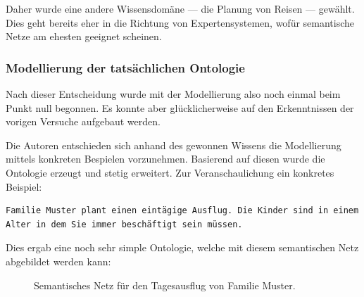 Daher wurde eine andere Wissensdomäne --- die Planung von Reisen --- gewählt. Dies geht bereits eher in die Richtung von Expertensystemen, wofür semantische Netze am ehesten geeignet scheinen.

\subsubsection{Modellierung der tatsächlichen Ontologie}
\label{sub:modellierung_der_ontologie_tatsaechliche}

Nach dieser Entscheidung wurde mit der Modellierung also noch einmal beim Punkt null begonnen. Es konnte aber glücklicherweise auf den Erkenntnissen der vorigen Versuche aufgebaut werden.

Die Autoren entschieden sich anhand des gewonnen Wissens die Modellierung mittels konkreten Bespielen vorzunehmen. Basierend auf diesen wurde die Ontologie erzeugt und stetig erweitert. Zur Veranschaulichung ein konkretes Beispiel:

\begin{lstlisting}[caption={Konkretes Beispiel einer Reiseplanung.},captionpos=b]
    Familie Muster plant einen eintägige Ausflug. Die Kinder sind in einem Alter in dem Sie immer beschäftigt sein müssen.
\end{lstlisting}

\newpage

Dies ergab eine noch sehr simple Ontologie, welche mit diesem semantischen Netz abgebildet werden kann:

\begin{figure}[H]
\centering {}
\caption{Semantisches Netz für den Tagesausflug von Familie Muster.\label{fig:famMuster}\protect\footnotemark}
\end{figure}

